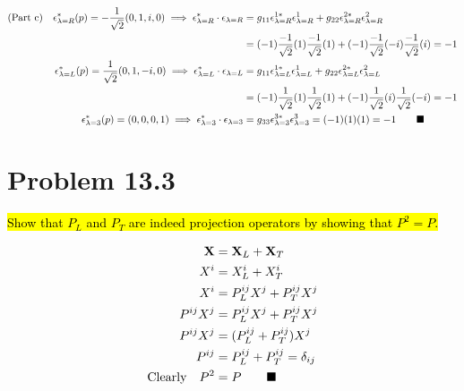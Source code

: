 \documentclass{article}
\begin{document}
\begin{align*}
  \qq*{(Part c)} \epsilon_{\lambda=R}^*(p)=-\frac{1}{\sqrt{2}}(0,1,i,0)\implies \epsilon_{\lambda=R}^*\cdot\epsilon_{\lambda=R} & =g_{11}\epsilon_{\lambda=R}^{1*}\epsilon_{\lambda=R}^1+g_{22}\epsilon_{\lambda=R}^{2*}\epsilon_{\lambda=R}^2 \\
                                                                                                                                & =(-1)\frac{-1}{\sqrt{2}}(1)\frac{-1}{\sqrt{2}}(1)+(-1)\frac{-1}{\sqrt{2}}(-i)\frac{-1}{\sqrt{2}}(i)=-1
  \\
  \epsilon_{\lambda=L}^*(p)=\frac{1}{\sqrt{2}}(0,1,-i,0)\implies \epsilon_{\lambda=L}^*\cdot\epsilon_{\lambda=L}                & =g_{11}\epsilon_{\lambda=L}^{1*}\epsilon_{\lambda=L}^1+g_{22}\epsilon_{\lambda=L}^{2*}\epsilon_{\lambda=L}^2 \\
                                                                                                                                & =(-1)\frac{1}{\sqrt{2}}(1)\frac{1}{\sqrt{2}}(1)+(-1)\frac{1}{\sqrt{2}}(i)\frac{1}{\sqrt{2}}(-i)
  =-1                                                                                                                                                                                                                                          \\
  \epsilon_{\lambda=3}^*(p)=(0,0,0,1)\implies \epsilon_{\lambda=3}^*\cdot\epsilon_{\lambda=3}                                   & =g_{33}\epsilon_{\lambda=3}^{3*}\epsilon_{\lambda=3}^3=(-1)(1)(1)
  =-1\qquad\blacksquare                                                                                                                                                                                                                        \\
\end{align*}

\section*{Problem 13.3}
\begin{quoting}
  \hl{Show that $P_L$ and $P_T$ are indeed projection operators by showing that $P^2=P$.}
\end{quoting}
\begin{align*}
  \vb{X}           & =\vb{X}_L+\vb{X}_T             \\
  X^i              & =X^i_L+X^i_T                   \\
  X^i              & =P^{ij}_LX^j+P^{ij}_TX^j       \\
  P^{ij}X^j        & =P^{ij}_LX^j+P^{ij}_TX^j       \\
  P^{ij}X^j        & =(P^{ij}_L+P^{ij}_T)X^j        \\
  P^{ij}           & =P^{ij}_L+P^{ij}_T=\delta_{ij} \\
  \qq*{Clearly}P^2 & =P\qquad\blacksquare
\end{align*}
\end{document}
